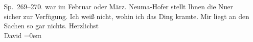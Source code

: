 \begin{ledgroupsized}[t]{13cm}
{{{                                Sp. 269–270.}}}\label{K_L00427_1h} war im Februar oder
                        März. Neuma{\geminationn}-Hofer stellt Ihnen die Nu{\geminationm}er
                    sicher zur Verfügung. Ich weiß nicht, wohin ich das Ding kramte. Mir liegt an
                    den Sachen so gar nichts.\pend
           \pstart
           Herzlichst{\\[\baselineskip]}\spacefill\mbox{David}\pend
           \leftskip=0em{}          \endnumbering{}\end{ledgroupsized}  \newcommand{\dateiname}{L00427}\newcommand{\titel}{Jakob Julius David an Arthur Schnitzler, [27. 3. 1895]}\newcommand{\editorInnen}{Martin Anton Müller und Gerd-Hermann Susen}
            \footnotesize
\begin{ledgroupsized}[t]{11.5cm}
\end{ledgroupsized}
         
      